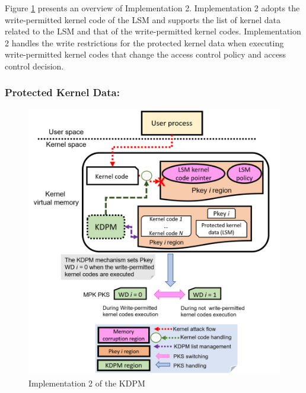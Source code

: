 Figure \ref{fig:implementation2_overview} presents an overview of Implementation
2.
%
Implementation 2 adopts the write-permitted kernel code of the LSM and supports
the list of kernel data related to the LSM and that of the write-permitted
kernel codes.
%
Implementation 2 handles the write restrictions for the protected kernel data when
executing write-permitted kernel codes that change the access control policy and
access control decision.
%



\subsubsection{Protected Kernel Data:}


\begin{figure}[t]
  \begin{center}
    \includegraphics[bb=0 0 875 923, scale=.280]{./imgs/005_screen_shot_2022-01-10_180226.png}
  \end{center}
  \caption{
    Implementation 2 of the KDPM
  }
 \label{fig:implementation2_overview}
\end{figure}


